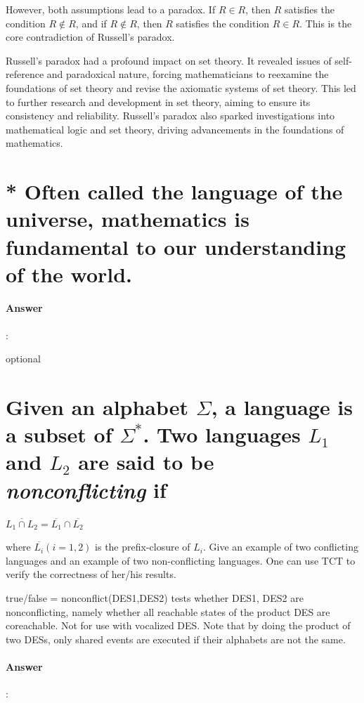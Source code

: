 \documentclass{article}
\begin{document}
However, both assumptions lead to a paradox. If $R \in R$, then $R$ satisfies the condition $R \notin R$, and if $R \notin R$, then $R$ satisfies the condition $R \in R$. This is the core contradiction of Russell's paradox.

Russell's paradox had a profound impact on set theory. It revealed issues of self-reference and paradoxical nature, forcing mathematicians to reexamine the foundations of set theory and revise the axiomatic systems of set theory. This led to further research and development in set theory, aiming to ensure its consistency and reliability. Russell's paradox also sparked investigations into mathematical logic and set theory, driving advancements in the foundations of mathematics.

\section{* Often called the language of the universe, mathematics is fundamental to our understanding of the world.}

\paragraph{Answer}:

optional

\section{Given an alphabet $\Sigma$, a language is a subset of $\Sigma^*$. Two languages $L_1$ and $L_2$ are said to be \textit{nonconflicting} if}

$\overline{L_1 \cap L_2} = \overline{L_1} \cap \overline{L_2} $

where $\overline{L_i} (i = 1, 2)$ is the prefix-closure of $L_i$. Give an example of two conflicting languages and an example of two non-conflicting languages. One can use TCT to verify the correctness of her/his results.

\begin{tcolorbox}
  true/false = nonconflict(DES1,DES2) tests whether DES1, DES2 are nonconflicting, namely whether all reachable states of the product DES are coreachable. Not for use with vocalized DES. Note that by doing the product of two DESs, only shared events are executed if their alphabets are not the same.
\end{tcolorbox}

\paragraph{Answer}:
\end{document}
